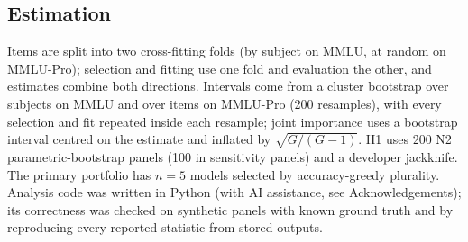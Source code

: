 \documentclass[preprint,12pt,authoryear]{elsarticle}
\begin{document}
\begin{table}[!htbp]
\centering
\caption{Data sources.}
\label{tab:data}
\small
{}
\end{table}

\subsection{Estimation}
Items are split into two cross-fitting folds (by subject on MMLU, at random on MMLU-Pro); selection and fitting use one fold and evaluation the other, and estimates combine both directions. Intervals come from a cluster bootstrap over subjects on MMLU and over items on MMLU-Pro (200 resamples), with every selection and fit repeated inside each resample; joint importance uses a bootstrap interval centred on the estimate and inflated by $\sqrt{G/(G-1)}$. H1 uses 200 N2 parametric-bootstrap panels (100 in sensitivity panels) and a developer jackknife. The primary portfolio has $n=5$ models selected by accuracy-greedy plurality. Analysis code was written in Python (with AI assistance, see Acknowledgements); its correctness was checked on synthetic panels with known ground truth and by reproducing every reported statistic from stored outputs.
\end{document}
